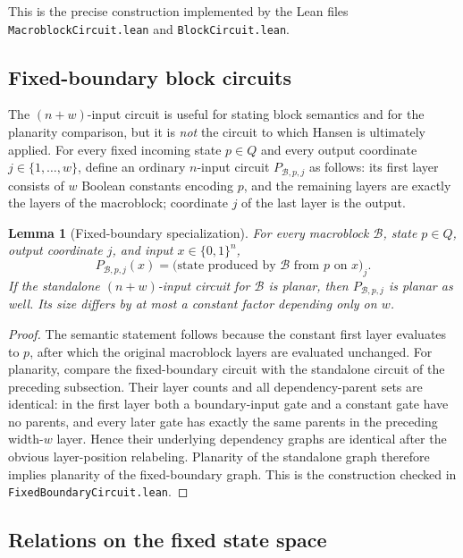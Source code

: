\documentclass[11pt]{article}
\newtheorem{lemma}[theorem]{Lemma}
\theoremstyle{definition}
\newcommand{\bits}{\{0,1\}}
\newcommand{\cB}{\mathcal{B}}
\begin{document}
This is the precise construction implemented by the Lean files
\texttt{MacroblockCircuit.lean} and \texttt{BlockCircuit.lean}.

\subsection{Fixed-boundary block circuits}\label{subsec:fixed-boundary}
The $(n+w)$-input circuit is useful for stating block semantics and for the
planarity comparison, but it is \emph{not} the circuit to which Hansen is
ultimately applied.  For every fixed incoming state $p\in Q$ and every output
coordinate $j\in\{1,\ldots,w\}$, define an ordinary $n$-input circuit
$P_{\cB,p,j}$ as follows: its first layer consists of $w$ Boolean constants
encoding $p$, and the remaining layers are exactly the layers of the
macroblock; coordinate $j$ of the last layer is the output.

\begin{lemma}[Fixed-boundary specialization]\label{lem:fixed-boundary}
For every macroblock $\cB$, state $p\in Q$, output coordinate $j$, and input
$x\in\bits^n$,
\[
  P_{\cB,p,j}(x)
  = \bigl(\text{state produced by $\cB$ from $p$ on $x$}\bigr)_j.
\]
If the standalone $(n+w)$-input circuit for $\cB$ is planar, then
$P_{\cB,p,j}$ is planar as well.  Its size differs by at most a constant
factor depending only on $w$.
\end{lemma}

\begin{proof}
The semantic statement follows because the constant first layer evaluates to
$p$, after which the original macroblock layers are evaluated unchanged.
For planarity, compare the fixed-boundary circuit with the standalone circuit
of the preceding subsection.  Their layer counts and all dependency-parent
sets are identical: in the first layer both a boundary-input gate and a
constant gate have no parents, and every later gate has exactly the same
parents in the preceding width-$w$ layer.  Hence their underlying dependency
graphs are identical after the obvious layer-position relabeling.  Planarity
of the standalone graph therefore implies planarity of the fixed-boundary
graph.  This is the construction checked in
\texttt{FixedBoundaryCircuit.lean}.
\end{proof}

\subsection{Relations on the fixed state space}
\end{document}

